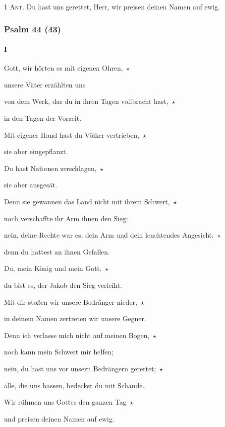\noindent \textsc{1 Ant.} Du hast uns gerettet, Herr, wir preisen deinen Namen auf ewig.

\subsubsection{Psalm 44 (43)} \paragraph{I}

\noindent Gott, wir hörten es mit eigenen Ohren,~$\star$~\nopagebreak

unsere Väter erzählten uns

\noindent von dem Werk, das du in ihren Tagen vollbracht hast,~$\star$~\nopagebreak

in den Tagen der Vorzeit.

\noindent Mit eigener Hand hast du Völker vertrieben,~$\star$~\nopagebreak

sie aber eingepflanzt.

\noindent Du hast Nationen zerschlagen,~$\star$~\nopagebreak

sie aber ausgesät.

\noindent Denn sie gewannen das Land nicht mit ihrem Schwert,~$\star$~\nopagebreak

noch verschaffte ihr Arm ihnen den Sieg;

\noindent nein, deine Rechte war es, dein Arm und dein leuchtendes Angesicht;~$\star$~\nopagebreak

denn du hattest an ihnen Gefallen.

\noindent Du, mein König und mein Gott,~$\star$~\nopagebreak

du bist es, der Jakob den Sieg verleiht.

\noindent Mit dir stoßen wir unsere Bedränger nieder,~$\star$~\nopagebreak

in deinem Namen zertreten wir unsere Gegner.

\noindent Denn ich verlasse mich nicht auf meinen Bogen,~$\star$~\nopagebreak

noch kann mein Schwert mir helfen;

\noindent nein, du hast uns vor unsern Bedrängern gerettet;~$\star$~\nopagebreak

alle, die uns hassen, bedeckst du mit Schande.

\noindent Wir rühmen uns Gottes den ganzen Tag~$\star$~\nopagebreak

und preisen deinen Namen auf ewig.

